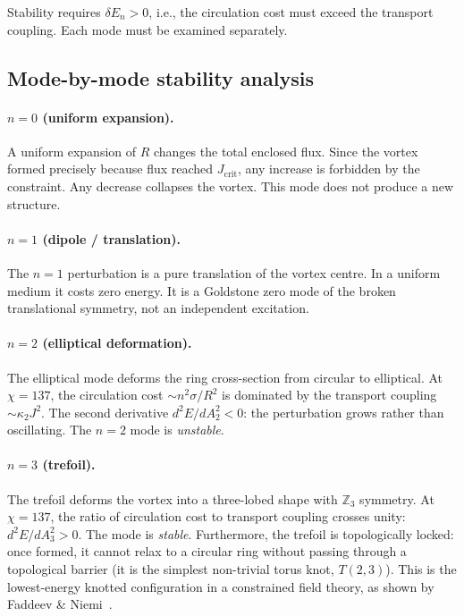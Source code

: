 \documentclass[11pt]{article}
\begin{document}
Stability requires $\delta E_n > 0$, i.e., the circulation cost must exceed
the transport coupling.
Each mode must be examined separately.

\subsection{Mode-by-mode stability analysis}

\paragraph{$n = 0$ (uniform expansion).}
A uniform expansion of $R$ changes the total enclosed flux.
Since the vortex formed precisely because flux reached $J_\text{crit}$, any
increase is forbidden by the constraint.
Any decrease collapses the vortex.
This mode does not produce a new structure.

\paragraph{$n = 1$ (dipole / translation).}
The $n = 1$ perturbation is a pure translation of the vortex centre.
In a uniform medium it costs zero energy.
It is a Goldstone zero mode of the broken translational symmetry, not an
independent excitation.

\paragraph{$n = 2$ (elliptical deformation).}
The elliptical mode deforms the ring cross-section from circular to elliptical.
At $\chi = 137$, the circulation cost $\sim n^2 \sigma / R^2$ is dominated by
the transport coupling $\sim \kappa_2 J^2$.
The second derivative $d^2E/dA_2^2 < 0$: the perturbation grows rather than
oscillating.
The $n = 2$ mode is \emph{unstable}.

\paragraph{$n = 3$ (trefoil).}
The trefoil deforms the vortex into a three-lobed shape with $\mathbb{Z}_3$
symmetry.
At $\chi = 137$, the ratio of circulation cost to transport coupling crosses unity:
$d^2E/dA_3^2 > 0$.
The mode is \emph{stable}.
Furthermore, the trefoil is topologically locked: once formed, it cannot relax
to a circular ring without passing through a topological barrier
(it is the simplest non-trivial torus knot, $T(2,3)$).
This is the lowest-energy knotted configuration in a constrained field theory,
as shown by Faddeev \& Niemi~\cite{FaddeevNiemi1997}.
\end{document}
